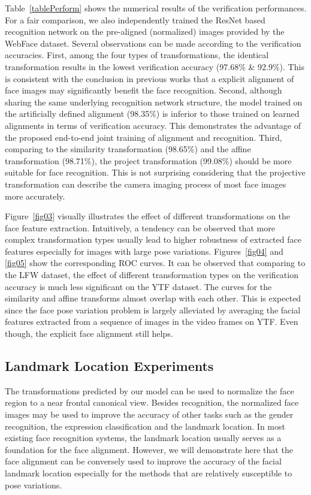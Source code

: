 \documentclass[10pt,twocolumn,letterpaper]{article}
\begin{document}
Table~\ref{tablePerform} shows the numerical results of the verification performances.
For a fair comparison, we also independently trained the ResNet based recognition network on the pre-aligned (normalized) images provided by the WebFace dataset. 
Several observations can be made according to the verification accuracies. 
First, among the four types of transformations, the identical transformation results in the lowest verification accuracy (97.68\% \& 92.9\%).
This is consistent with the conclusion in previous works that a explicit alignment of face images may significantly benefit the face recognition.
Second, although sharing the same underlying recognition network structure, the model trained on the artificially defined alignment (98.35\%) is inferior to those trained on learned alignments in terms of verification accuracy.
This demonstrates the advantage of the proposed end-to-end joint training of alignment and recognition.
Third, comparing to the similarity transformation (98.65\%) and the affine transformation (98.71\%), the project transformation (99.08\%) should be more suitable for face recognition.
This is not surprising considering that the projective transformation can describe the camera imaging process of most face images more accurately.

Figure~\ref{fig03} visually illustrates the effect of different transformations on the face feature extraction.
Intuitively, a tendency can be observed that more complex transformation types usually lead to higher robustness of extracted face features especially for images with large pose variations.
Figures~\ref{fig04} and \ref{fig05} show the corresponding ROC curves.
It can be observed that comparing to the LFW dataset, the effect of different transformation types on the verification accuracy is much less significant on the YTF dataset.
The curves for the similarity and affine transforms almost overlap with each other.
This is expected since the face pose variation problem is largely alleviated by averaging the facial features extracted from a sequence of images in the video frames on YTF.
Even though, the explicit face alignment still helps.

\subsection{Landmark Location Experiments}

The transformations predicted by our model can be used to normalize the face region to a near frontal canonical view.
Besides recognition, the normalized face images may be used to improve the accuracy of other tasks such as the gender recognition, the expression classification and the landmark location.
In most existing face recognition systems, the landmark location usually serves as a foundation for the face alignment.
However, we will demonstrate here that the face alignment can be conversely used to improve the accuracy of the facial landmark location especially for the methods that are relatively susceptible to pose variations.
\end{document}
